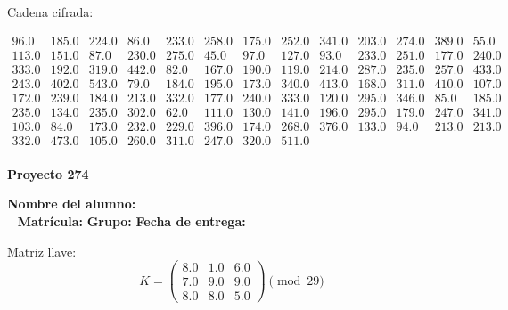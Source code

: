 \documentclass[12pt]{article}
\begin{document}
Cadena cifrada:
\begin{center}
$\begin{array}{lllllllllllll}
96.0 & 185.0 & 224.0 & 86.0 & 233.0 & 258.0 & 175.0 & 252.0 & 341.0 & 203.0 & 274.0 & 389.0 & 55.0\\
113.0 & 151.0 & 87.0 & 230.0 & 275.0 & 45.0 & 97.0 & 127.0 & 93.0 & 233.0 & 251.0 & 177.0 & 240.0\\
333.0 & 192.0 & 319.0 & 442.0 & 82.0 & 167.0 & 190.0 & 119.0 & 214.0 & 287.0 & 235.0 & 257.0 & 433.0\\
243.0 & 402.0 & 543.0 & 79.0 & 184.0 & 195.0 & 173.0 & 340.0 & 413.0 & 168.0 & 311.0 & 410.0 & 107.0\\
172.0 & 239.0 & 184.0 & 213.0 & 332.0 & 177.0 & 240.0 & 333.0 & 120.0 & 295.0 & 346.0 & 85.0 & 185.0\\
235.0 & 134.0 & 235.0 & 302.0 & 62.0 & 111.0 & 130.0 & 141.0 & 196.0 & 295.0 & 179.0 & 247.0 & 341.0\\
103.0 & 84.0 & 173.0 & 232.0 & 229.0 & 396.0 & 174.0 & 268.0 & 376.0 & 133.0 & 94.0 & 213.0 & 213.0\\
332.0 & 473.0 & 105.0 & 260.0 & 311.0 & 247.0 & 320.0 & 511.0\\
\end{array}$
\end{center}

\newpage


\textbf{Proyecto 274}

\textbf{Nombre del alumno:} \underline{\hspace{13cm}}\\\
\vspace{1cm}
\textbf{Matrícula:} \underline{\hspace{4cm}} \hspace{1cm}
\textbf{Grupo:} \underline{\hspace{2cm}}
\textbf{Fecha de entrega:} \underline{\hspace{2cm}}

\medskip

Matriz llave:
\[
K = \begin{pmatrix}
8.0 & 1.0 & 6.0\\
7.0 & 9.0 & 9.0\\
8.0 & 8.0 & 5.0
\end{pmatrix} \pmod{29}
\]
\end{document}
